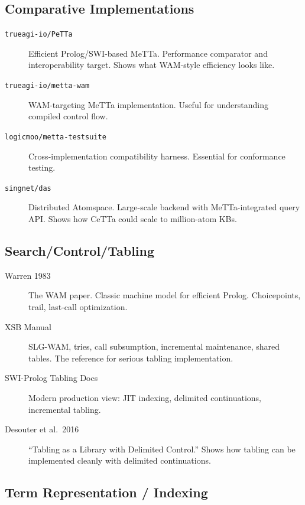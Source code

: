 \documentclass[11pt]{article}
\newcommand{\code}[1]{\texttt{#1}}
\newcommand{\CeTTa}{\textup{CeTTa}}
\newcommand{\WAM}{\textup{WAM}}
\newcommand{\XSB}{\textup{XSB}}
\begin{document}
\subsection{Comparative Implementations}

\begin{description}
\item[\code{trueagi-io/PeTTa}]
  Efficient Prolog/SWI-based MeTTa.  Performance comparator and
  interoperability target.  Shows what \WAM{}-style efficiency looks like.

\item[\code{trueagi-io/metta-wam}]
  WAM-targeting MeTTa implementation.  Useful for understanding
  compiled control flow.

\item[\code{logicmoo/metta-testsuite}]
  Cross-implementation compatibility harness.  Essential for
  conformance testing.

\item[\code{singnet/das}]
  Distributed Atomspace.  Large-scale backend with MeTTa-integrated
  query API.  Shows how \CeTTa{} could scale to million-atom KBs.
\end{description}

\subsection{Search/Control/Tabling}

\begin{description}
\item[Warren 1983]
  The WAM paper.  Classic machine model for efficient Prolog.
  Choicepoints, trail, last-call optimization.

\item[\XSB{} Manual]
  SLG-WAM, tries, call subsumption, incremental maintenance, shared
  tables.  The reference for serious tabling implementation.

\item[SWI-Prolog Tabling Docs]
  Modern production view: JIT indexing, delimited continuations,
  incremental tabling.

\item[Desouter et al.\ 2016]
  ``Tabling as a Library with Delimited Control.''  Shows how tabling
  can be implemented cleanly with delimited continuations.
\end{description}

\subsection{Term Representation / Indexing}
\end{document}
